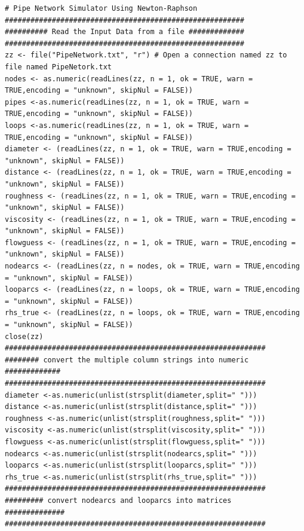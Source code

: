  
\begin{lstlisting}[caption=R code demonstrating a Pipeline Network Simulator \\ This fragment of code reads the data file and converts the lines (read as text) into numeric values for subsequent processing, label=lst:PipeNetwork1]
# Pipe Network Simulator Using Newton-Raphson
########################################################
########## Read the Input Data from a file #############
########################################################
zz <- file("PipeNetwork.txt", "r") # Open a connection named zz to file named PipeNetork.txt
nodes <- as.numeric(readLines(zz, n = 1, ok = TRUE, warn = TRUE,encoding = "unknown", skipNul = FALSE))
pipes <-as.numeric(readLines(zz, n = 1, ok = TRUE, warn = TRUE,encoding = "unknown", skipNul = FALSE))
loops <-as.numeric(readLines(zz, n = 1, ok = TRUE, warn = TRUE,encoding = "unknown", skipNul = FALSE))
diameter <- (readLines(zz, n = 1, ok = TRUE, warn = TRUE,encoding = "unknown", skipNul = FALSE))
distance <- (readLines(zz, n = 1, ok = TRUE, warn = TRUE,encoding = "unknown", skipNul = FALSE))
roughness <- (readLines(zz, n = 1, ok = TRUE, warn = TRUE,encoding = "unknown", skipNul = FALSE))
viscosity <- (readLines(zz, n = 1, ok = TRUE, warn = TRUE,encoding = "unknown", skipNul = FALSE))
flowguess <- (readLines(zz, n = 1, ok = TRUE, warn = TRUE,encoding = "unknown", skipNul = FALSE))
nodearcs <- (readLines(zz, n = nodes, ok = TRUE, warn = TRUE,encoding = "unknown", skipNul = FALSE))
looparcs <- (readLines(zz, n = loops, ok = TRUE, warn = TRUE,encoding = "unknown", skipNul = FALSE))
rhs_true <- (readLines(zz, n = loops, ok = TRUE, warn = TRUE,encoding = "unknown", skipNul = FALSE))
close(zz)
#############################################################
######## convert the multiple column strings into numeric  #############
#############################################################
diameter <-as.numeric(unlist(strsplit(diameter,split=" ")))
distance <-as.numeric(unlist(strsplit(distance,split=" ")))
roughness <-as.numeric(unlist(strsplit(roughness,split=" ")))
viscosity <-as.numeric(unlist(strsplit(viscosity,split=" ")))
flowguess <-as.numeric(unlist(strsplit(flowguess,split=" ")))
nodearcs <-as.numeric(unlist(strsplit(nodearcs,split=" ")))
looparcs <-as.numeric(unlist(strsplit(looparcs,split=" ")))
rhs_true <-as.numeric(unlist(strsplit(rhs_true,split=" ")))
#############################################################
######### convert nodearcs and looparcs into matrices    ##############
#############################################################

\end{lstlisting}
